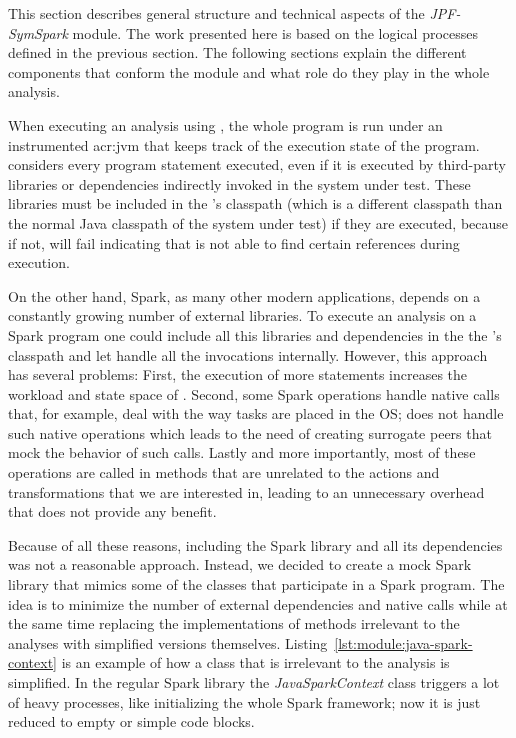 \label{sec:module}


This section describes general structure and technical aspects of the \textit{JPF-SymSpark} module. The work presented here is based on the logical processes defined in the previous section. The following sections explain the different components that conform the module and what role do they play in the whole analysis.



When executing an analysis using \jpf, the whole program is run under an instrumented \acrshort{acr:jvm} that keeps track of the execution state of the program. \jpf considers every program statement executed, even if it is executed by third-party libraries or dependencies indirectly invoked in the system under test. These libraries must be included in the \jpf's classpath (which is a different classpath than the normal Java classpath of the system under test) if they are executed, because if not, \jpf will fail indicating that is not able to find certain references during execution.

On the other hand, Spark, as many other modern applications, depends on a constantly growing number of external libraries. To execute an analysis on a Spark program one could include all this libraries and dependencies in the the \jpf's classpath and let \jpf handle all the invocations internally. However, this approach has several problems: First, the execution of more statements increases the workload and state space of \jpf. Second, some Spark operations handle native calls that, for example, deal with the way tasks are placed in the OS; \jpf does not handle such native operations which leads to the need of creating surrogate peers that mock the behavior of such calls. Lastly and more importantly, most of these operations are called in methods that are unrelated to the actions and transformations that we are interested in, leading to an unnecessary overhead that does not provide any benefit.

Because of all these reasons, including the Spark library and all its dependencies was not a reasonable approach. Instead, we decided to create a mock Spark library that mimics some of the classes that participate in a Spark program. The idea is to minimize the number of external dependencies and native calls while at the same time replacing the implementations of methods irrelevant to the analyses with simplified versions themselves. Listing~\ref{lst:module:java-spark-context} is an example of how a class that is irrelevant to the analysis is simplified. In the regular Spark library the \textit{JavaSparkContext} class triggers a lot of heavy processes, like initializing the whole Spark framework; now it is just reduced to empty or simple code blocks.

